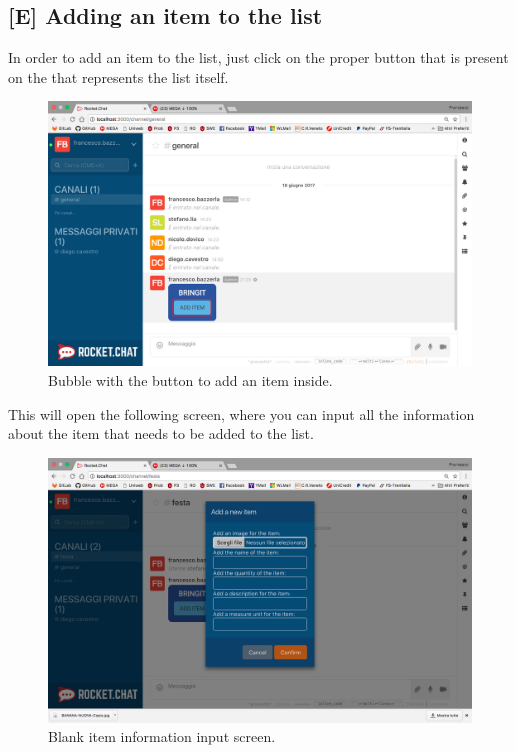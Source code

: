 \newpage
\subsection{[E] Adding an item to the list}
In order to add an item to the list, just click on the proper button that is present on the  that represents the list itself.

\begin{figure}[H]
  \centering 
  \includegraphics[width=\textwidth]{Sections/3-HowToUse/Images/bubble_empty_add_item.png}
  \caption{Bubble with the button to add an item inside.}
\end{figure}

This will open the following screen, where you can input all the information about the item that needs to be added to the list. \\

\begin{figure}[H]
  \centering 
  \includegraphics[width=\textwidth]{Sections/3-HowToUse/Images/item_add.png}
  \caption{Blank item information input screen.}
\end{figure}

